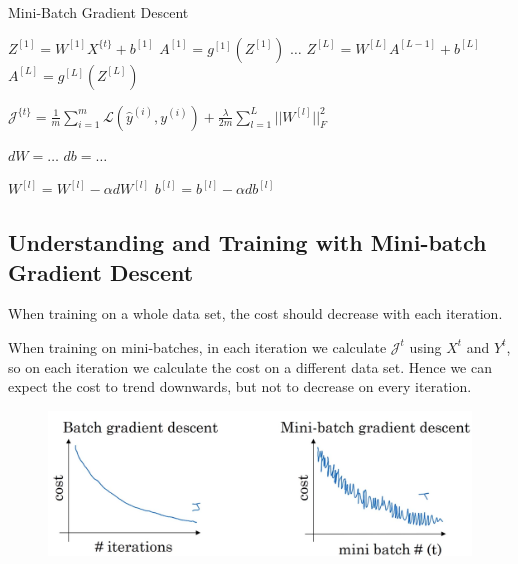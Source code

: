 \begin{algorithm}
    \caption*{Mini-Batch Gradient Descent}
    \begin{algorithmic}[1]

        \State $Z^{[1]} = W^{[1]}X^{\{t\}} + b^{[1]}$
        \State $A^{[1]} = g^{[1]}(Z^{[1]})$
        \State $\ldots$
        \State $Z^{[L]} = W^{[L]}A^{[L-1]} + b^{[L]}$
        \State $A^{[L]} = g^{[L]}(Z^{[L]})$
        
        \State $\mathcal{J}^{\{t\}} = \frac{1}{m} \sum_{i=1}^{m} \mathcal{L}(\hat{y}^{(i)}, y^{(i)}) + \frac{\lambda}{2m} \sum_{l=1}^{L} ||W^{[l]}||_F^2$ 

        \State $dW = \ldots$    
        \State $db = \ldots$
        
        \State $W^{[l]} = W^{[l]} - \alpha dW^{[l]}$
        \State $b^{[l]} = b^{[l]} - \alpha db^{[l]}$
    \EndFor
    \end{algorithmic}
\end{algorithm}

\newpage

\subsection*{Understanding and Training with Mini-batch Gradient Descent}

When training on a whole data set, the cost should decrease with each iteration.

When training on mini-batches, in each iteration we calculate $\mathcal{J}^t$  using $X^t$  and $Y^t$, so on each iteration we calculate the cost on a different data set. Hence we can expect the cost to trend downwards, but not to decrease on every iteration.

\begin{figure}[htbp]
    \begin{minipage}[t]{\textwidth}
        \includegraphics[width=\linewidth]{images/batch_vs_minibatch_gd.png}
    \end{minipage}
\end{figure}

